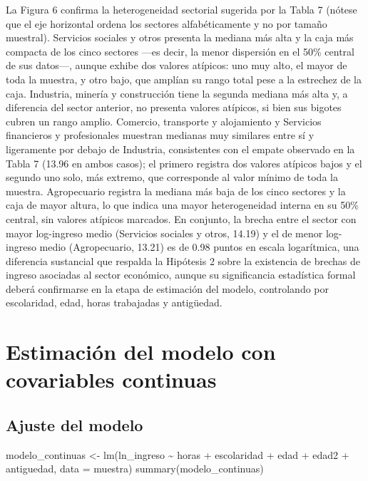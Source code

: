 \documentclass[
  spanish,
  letterpaper,
  DIV=11,
  numbers=noendperiod]{scrartcl}
\newenvironment{Shaded}{\begin{snugshade}}{\end{snugshade}}
\newcommand{\AttributeTok}[1]{\textcolor[rgb]{0.40,0.45,0.13}{#1}}
\newcommand{\FunctionTok}[1]{\textcolor[rgb]{0.28,0.35,0.67}{#1}}
\newcommand{\NormalTok}[1]{\textcolor[rgb]{0.00,0.23,0.31}{#1}}
\newcommand{\OtherTok}[1]{\textcolor[rgb]{0.00,0.23,0.31}{#1}}
\newcommand{\SpecialCharTok}[1]{\textcolor[rgb]{0.37,0.37,0.37}{#1}}
\begin{document}
La Figura 6 confirma la heterogeneidad sectorial sugerida por la Tabla 7
(nótese que el eje horizontal ordena los sectores alfabéticamente y no
por tamaño muestral). Servicios sociales y otros presenta la mediana más
alta y la caja más compacta de los cinco sectores ---es decir, la menor
dispersión en el 50\% central de sus datos---, aunque exhibe dos valores
atípicos: uno muy alto, el mayor de toda la muestra, y otro bajo, que
amplían su rango total pese a la estrechez de la caja. Industria,
minería y construcción tiene la segunda mediana más alta y, a diferencia
del sector anterior, no presenta valores atípicos, si bien sus bigotes
cubren un rango amplio. Comercio, transporte y alojamiento y Servicios
financieros y profesionales muestran medianas muy similares entre sí y
ligeramente por debajo de Industria, consistentes con el empate
observado en la Tabla 7 (13.96 en ambos casos); el primero registra dos
valores atípicos bajos y el segundo uno solo, más extremo, que
corresponde al valor mínimo de toda la muestra. Agropecuario registra la
mediana más baja de los cinco sectores y la caja de mayor altura, lo que
indica una mayor heterogeneidad interna en su 50\% central, sin valores
atípicos marcados. En conjunto, la brecha entre el sector con mayor
log-ingreso medio (Servicios sociales y otros, 14.19) y el de menor
log-ingreso medio (Agropecuario, 13.21) es de 0.98 puntos en escala
logarítmica, una diferencia sustancial que respalda la Hipótesis 2 sobre
la existencia de brechas de ingreso asociadas al sector económico,
aunque su significancia estadística formal deberá confirmarse en la
etapa de estimación del modelo, controlando por escolaridad, edad, horas
trabajadas y antigüedad.

\section{Estimación del modelo con covariables
continuas}\label{estimaciuxf3n-del-modelo-con-covariables-continuas}

\subsection{Ajuste del modelo}\label{ajuste-del-modelo}

\begin{Shaded}
\begin{Highlighting}[]
\NormalTok{modelo\_continuas }\OtherTok{\textless{}{-}} \FunctionTok{lm}\NormalTok{(ln\_ingreso }\SpecialCharTok{\textasciitilde{}}\NormalTok{ horas }\SpecialCharTok{+}\NormalTok{ escolaridad }\SpecialCharTok{+}\NormalTok{ edad }\SpecialCharTok{+}\NormalTok{ edad2 }\SpecialCharTok{+}\NormalTok{ antiguedad,}
                        \AttributeTok{data =}\NormalTok{ muestra)}
\FunctionTok{summary}\NormalTok{(modelo\_continuas)}
\end{Highlighting}
\end{Shaded}
\end{document}
